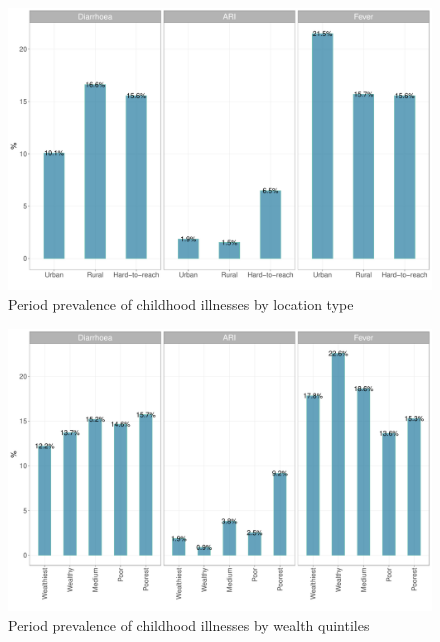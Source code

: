 \documentclass[12pt,a4paper]{article}
\begin{document}
\newpage

\begin{figure}[H]

{\centering \includegraphics{kayahReport_files/figure-latex/ill1plot-1} 

}

\caption{Period prevalence of childhood illnesses by location type}\label{fig:ill1plot}
\end{figure}

\begin{figure}[H]

{\centering \includegraphics{kayahReport_files/figure-latex/ill2plot-1} 

}

\caption{Period prevalence of childhood illnesses by wealth quintiles}\label{fig:ill2plot}
\end{figure}
\end{document}
